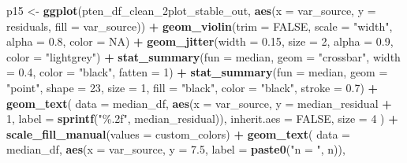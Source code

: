 \documentclass[
]{article}
\newenvironment{Shaded}{\begin{snugshade}}{\end{snugshade}}
\newcommand{\AttributeTok}[1]{\textcolor[rgb]{0.13,0.29,0.53}{#1}}
\newcommand{\ConstantTok}[1]{\textcolor[rgb]{0.56,0.35,0.01}{#1}}
\newcommand{\DecValTok}[1]{\textcolor[rgb]{0.00,0.00,0.81}{#1}}
\newcommand{\FloatTok}[1]{\textcolor[rgb]{0.00,0.00,0.81}{#1}}
\newcommand{\FunctionTok}[1]{\textcolor[rgb]{0.13,0.29,0.53}{\textbf{#1}}}
\newcommand{\NormalTok}[1]{#1}
\newcommand{\OtherTok}[1]{\textcolor[rgb]{0.56,0.35,0.01}{#1}}
\newcommand{\SpecialCharTok}[1]{\textcolor[rgb]{0.81,0.36,0.00}{\textbf{#1}}}
\newcommand{\StringTok}[1]{\textcolor[rgb]{0.31,0.60,0.02}{#1}}
\begin{document}
\begin{Shaded}
\begin{Highlighting}[]
\NormalTok{p15 }\OtherTok{\textless{}{-}} \FunctionTok{ggplot}\NormalTok{(pten\_df\_clean\_2plot\_stable\_out, }\FunctionTok{aes}\NormalTok{(}\AttributeTok{x =}\NormalTok{ var\_source, }\AttributeTok{y =}\NormalTok{ residuals, }\AttributeTok{fill =}\NormalTok{ var\_source)) }\SpecialCharTok{+}
  \FunctionTok{geom\_violin}\NormalTok{(}\AttributeTok{trim =} \ConstantTok{FALSE}\NormalTok{, }\AttributeTok{scale =} \StringTok{"width"}\NormalTok{, }\AttributeTok{alpha =} \FloatTok{0.8}\NormalTok{, }\AttributeTok{color =} \ConstantTok{NA}\NormalTok{) }\SpecialCharTok{+}
  \FunctionTok{geom\_jitter}\NormalTok{(}\AttributeTok{width =} \FloatTok{0.15}\NormalTok{, }\AttributeTok{size =} \DecValTok{2}\NormalTok{, }\AttributeTok{alpha =} \FloatTok{0.9}\NormalTok{, }\AttributeTok{color =} \StringTok{"lightgrey"}\NormalTok{) }\SpecialCharTok{+}
  \FunctionTok{stat\_summary}\NormalTok{(}\AttributeTok{fun =}\NormalTok{ median, }\AttributeTok{geom =} \StringTok{"crossbar"}\NormalTok{, }\AttributeTok{width =} \FloatTok{0.4}\NormalTok{, }\AttributeTok{color =} \StringTok{"black"}\NormalTok{, }\AttributeTok{fatten =} \DecValTok{1}\NormalTok{) }\SpecialCharTok{+}
  \FunctionTok{stat\_summary}\NormalTok{(}\AttributeTok{fun =}\NormalTok{ median, }\AttributeTok{geom =} \StringTok{"point"}\NormalTok{, }\AttributeTok{shape =} \DecValTok{23}\NormalTok{, }\AttributeTok{size =} \DecValTok{1}\NormalTok{, }\AttributeTok{fill =} \StringTok{"black"}\NormalTok{, }\AttributeTok{color =} \StringTok{"black"}\NormalTok{, }\AttributeTok{stroke =} \FloatTok{0.7}\NormalTok{) }\SpecialCharTok{+}
  \FunctionTok{geom\_text}\NormalTok{(}
    \AttributeTok{data =}\NormalTok{ median\_df,}
    \FunctionTok{aes}\NormalTok{(}\AttributeTok{x =}\NormalTok{ var\_source, }\AttributeTok{y =}\NormalTok{ median\_residual }\SpecialCharTok{+} \DecValTok{1}\NormalTok{, }\AttributeTok{label =} \FunctionTok{sprintf}\NormalTok{(}\StringTok{"\%.2f"}\NormalTok{, median\_residual)),}
    \AttributeTok{inherit.aes =} \ConstantTok{FALSE}\NormalTok{,}
    \AttributeTok{size =} \DecValTok{4}
\NormalTok{  ) }\SpecialCharTok{+}
  \FunctionTok{scale\_fill\_manual}\NormalTok{(}\AttributeTok{values =}\NormalTok{ custom\_colors) }\SpecialCharTok{+}
  \FunctionTok{geom\_text}\NormalTok{(}
    \AttributeTok{data =}\NormalTok{ median\_df,}
    \FunctionTok{aes}\NormalTok{(}\AttributeTok{x =}\NormalTok{ var\_source, }\AttributeTok{y =} \FloatTok{7.5}\NormalTok{, }\AttributeTok{label =} \FunctionTok{paste0}\NormalTok{(}\StringTok{"n = "}\NormalTok{, n)),}

\end{Highlighting}
\end{Shaded}
\end{document}
